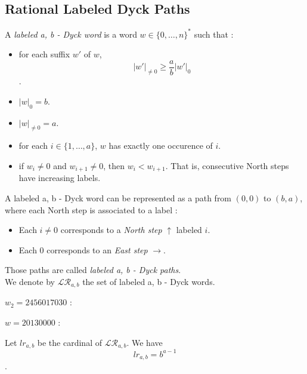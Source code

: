 \subsection{Rational Labeled Dyck Paths}

\begin{definition}
    A \emph{labeled a, b - Dyck word} is a word $w \in 
    \{0, \ldots, n\}^*$ such that :
    \begin{itemize}
        \item for each suffix $w'$ of $w$,
            $$|w'|_{\neq 0} \geqslant \frac{a}{b}|w'|_0$$.
        \item $|w|_0 = b$.
        \item $|w|_{\neq 0} = a$.
        \item for each $i \in \{1, \ldots, a\}$, $w$ has 
            exactly one occurence of $i$.
        \item if $w_i \neq 0$ and $w_{i+1} \neq 0$,
            then $w_i < w_{i+1}$. That is, consecutive
            North steps have increasing labels.
    \end{itemize}
    A labeled a, b - Dyck word can be represented
    as a path from $(0,0)$ to $(b,a)$, where each North
    step is associated to a label :
    \begin{itemize}
        \item Each $i \neq 0$ corresponds to a
            \emph{North step} $\uparrow$ labeled $i$.
        \item Each $0$ corresponds to an
            \emph{East step} $\rightarrow$.
    \end{itemize}
    Those paths are called \emph{labeled a, b - Dyck paths}.\\
    We denote by $\mathcal{LR}_{a,b}$ the set of labeled
    a, b - Dyck words.
\end{definition}

\begin{example}[$a > b : a = 7, b = 3$]
       $w_2 = 2456017030$ :\\
    
\end{example}

\begin{example}[$a < b : a = 3, b = 5$]
    $w = 20130000$ :\\
    
\end{example}

\begin{theorem}
    Let $lr_{a,b}$ be the cardinal of $\mathcal{LR}_{a,b}$.
    We have $$lr_{a,b} = b^{a - 1}$$.
\end{theorem}

